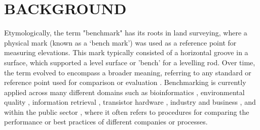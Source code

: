 \section{BACKGROUND} 

Etymologically, the term "benchmark" has its roots in land surveying, where a physical mark (known as a ‘bench mark’) was used as a reference point for measuring elevations. This mark typically consisted of a horizontal groove in a surface, which supported a level surface or 'bench' for a levelling rod. Over time, the term evolved to encompass a broader meaning, referring to any standard or reference point used for comparison or evaluation \cite{oed}. 
Benchmarking is currently applied across many different domains such as  bioinformatics \cite{Aniba2010}, environmental quality \cite{Henning2000}, information retrieval \cite{thakur2021beir}, transistor hardware \cite{Cheng2022}, industry and business \cite{Camp1989}, and within the public sector \cite{Bruno2014}, where it often refers to procedures for comparing the performance or best practices of different companies or processes. %
